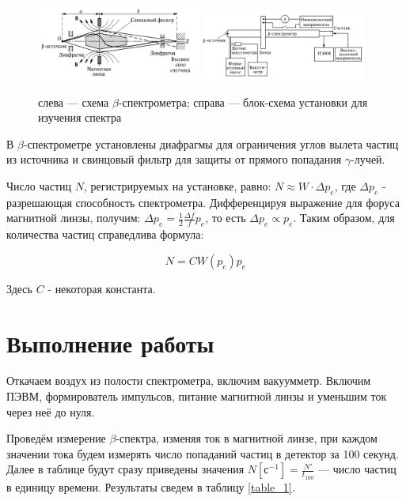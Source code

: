 \documentclass[12pt]{kiarticle}
\begin{document}
	\begin{figure}[h]
	\centering
	\includegraphics[width=0.48\textwidth]{lab}
	\hfill
	\includegraphics[width=0.48\textwidth]{lab2}
	\caption{слева --- схема $\beta$-спектрометра; справа --- блок-схема установки для изучения спектра}
	\label{pic:scheme}
\end{figure}

В $\beta$-спектрометре установлены диафрагмы для ограничения углов вылета частиц из источника и свинцовый фильтр для защиты от прямого попадания $\gamma$-лучей. 

Число частиц $N$, регистрируемых на установке, равно: $N \approx W \cdot \Delta p_e$, где $\Delta p_e$ - разрешающая способность спектрометра. Дифференцируя выражение для форуса магнитной линзы, получим: $\Delta p_e = \frac{1}{2}\frac{\Delta f}{f}p_e$, то есть $\Delta p_e \propto p_e$. Таким образом, для количества частиц справедлива формула: 

\begin{equation}\label{N}
 N = CW(p_e)p_e 
\end{equation}

Здесь $C$ - некоторая константа.


\section{Выполнение работы}

Откачаем воздух из полости спектрометра, включим вакуумметр. Включим ПЭВМ, формирователь импульсов, питание магнитной линзы и уменьшим ток через неё до нуля. 

Проведём измерение $\beta$-спектра, изменяя ток в магнитной линзе, при каждом значении тока будем измерять число попаданий частиц в детектор за 100 секунд. Далее в таблице будут сразу приведены значения $ N[с^{-1}] = \frac{N'}{t_{100}} $ --- число частиц в единицу времени. Результаты сведем в таблицу \ref{table_1}. 
\end{document}
